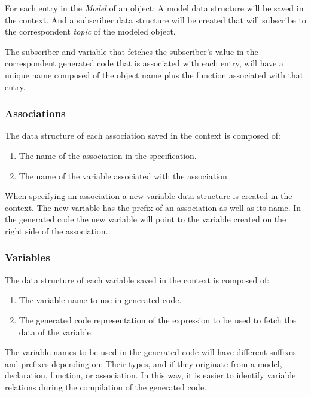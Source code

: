 For each entry in the \textit{Model} of an object: A model data structure will be saved in the context. And a subscriber data structure will be created that will subscribe to the correspondent \textit{topic} of the modeled object.

The subscriber and variable that fetches the subscriber’s value in the correspondent generated code that is associated with each entry, will have a unique name composed of the object name plus the function associated with that entry.


\subsubsection{Associations}
\label{sssec:compileAssoc}

The data structure of each association saved in the context is composed of:

\begin{enumerate}
    \item The name of the association in the specification.
    \item The name of the variable associated with the association.
\end{enumerate}

When specifying an association a new variable data structure is created in the context. The new variable has the prefix of an association as well as its name. In the generated code the new variable will point to the variable created on the right side of the association.


\subsubsection{Variables}
\label{sssec:compileVars}

The data structure of each variable saved in the context is composed of:

\begin{enumerate}
    \item The variable name to use in generated code.
    \item The generated code representation of the expression to be used to fetch the data of the variable.
\end{enumerate}

The variable names to be used in the generated code will have different suffixes and prefixes depending on: Their types, and if they originate from a model, declaration, function, or association. In this way, it is easier to identify variable relations during the compilation of the generated code.

